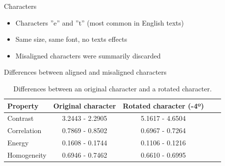 \documentclass[notes]{beamer}
\begin{document}
\begin{frame}

\begin{block}{Characters}

\begin{itemize}

\item Characters ''e'' and ''t'' (most common in English texts)

\item Same size, same font, no texts effects

\item Misaligned characters were summarily discarded

\end{itemize}

\end{block}

\end{frame}

\begin{frame}

\begin{block}{Differences between aligned and misaligned characters}

\begin{table}
\label{tab:properties_differences}
\caption{Differences between an original character and a rotated character.}
\begin{center}
\begin{tabular}{l*{3}{c}r}
Property & Original character & Rotated character (-4º) \\
\hline
Contrast & 3.2443 - 2.2905 & 5.1617 - 4.6504 \\
Correlation & 0.7869 - 0.8502 & 0.6967 - 0.7264 \\
Energy & 0.1608 - 0.1744 & 0.1106 - 0.1216 \\
Homogeneity & 0.6946 - 0.7462 & 0.6610 - 0.6995 \\
\end{tabular}
\end{center}
\end{table}

\end{block}

\end{frame}
\end{document}
